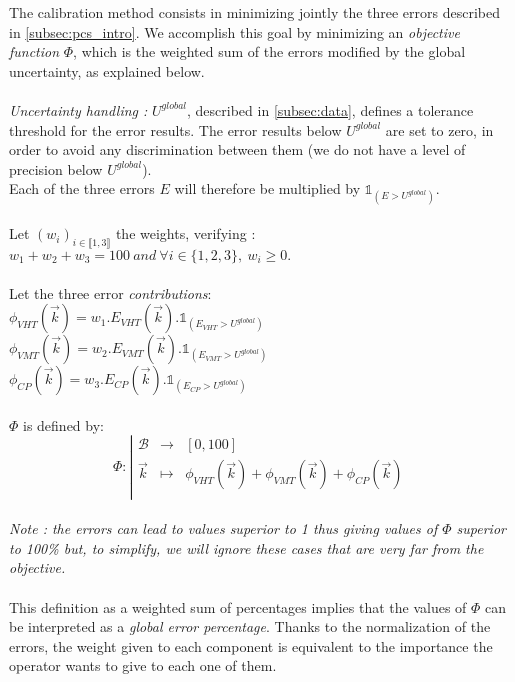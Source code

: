 The calibration method consists in minimizing jointly the three errors described in \ref{subsec:pcs_intro}. We accomplish this goal by minimizing an \emph{objective function} $\Phi$, which is the weighted sum of the errors modified by the global uncertainty, as explained below.\\
\\
\emph{Uncertainty handling :} $U^{global}$, described in \ref{subsec:data}, defines a tolerance threshold for the error results. The error results below $U^{global}$ are set to zero, in order to avoid any discrimination between them (we do not have a level of precision below $U^{global}$).\\
Each of the three errors $E$ will therefore be multiplied by $\mathds{1}_{(E>U^{global})}.$\\ 
\\
Let $(w_{i})_{i\in\llbracket 1,3 \rrbracket}$ the weights, verifying :\\
$w_{1}+w_{2}+w_{3}=100\ and\ \forall i\in \{1,2,3\},\ w_{i}\geq 0.$\\
\\
Let the three error \emph{contributions}:\\
$\phi_{VHT}(\vec{k})=w_{1}.E_{VHT}(\vec{k}).\mathds{1}_{(E_{VHT}>U^{global})}$\\
$\phi_{VMT}(\vec{k})=w_{2}.E_{VMT}(\vec{k}).\mathds{1}_{(E_{VMT}>U^{global})}$\\
$\phi_{CP}(\vec{k})=w_{3}.E_{CP}(\vec{k}).\mathds{1}_{(E_{CP}>U^{global})}$\\
\\
$\Phi$ is defined by:\\
\begin{displaymath}
		\Phi:
		\left|
  		\begin{array}{rcl}
    	\mathscr{B} & \longrightarrow &[0,100] \\
    	\vec{k} & \longmapsto &  \phi_{VHT}(\vec{k})+\phi_{VMT}(\vec{k})+\phi_{CP}(\vec{k}) \\
  	\end{array}
	\right.
\end{displaymath}
\\
\emph{Note : the errors can lead to values superior to 1 thus giving values of $\Phi$ superior to 100\% but, to simplify, we will ignore these cases that are very far from the objective.}\\
\\

This definition as a weighted sum of percentages implies that the values of $\Phi$ can be interpreted as a \emph{global error percentage}. Thanks to the normalization of the errors, the weight given to each component is equivalent to the importance the operator wants to give to each one of them.
